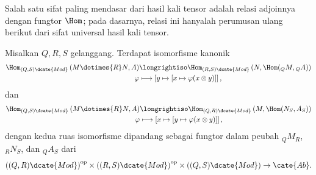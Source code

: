 Salah satu sifat paling mendasar dari hasil kali tensor adalah relasi adjoinnya dengan fungtor $\Hom$; pada dasarnya, relasi ini hanyalah perumusan ulang berikut dari sifat universal hasil kali tensor.
\begin{theorem}\label{prop:Hom-tensor-adjunction}
	Misalkan $Q, R, S$ gelanggang. Terdapat isomorfisme kanonik
	\begin{align*}
		\Hom_{(Q,S)\dcate{Mod}} \left( M \dotimes{R} N, A \right) & \longrightiso \Hom_{(R,S)\dcate{Mod}} \left( N, \Hom({}_Q M, {}_Q A) \right) \\
		\varphi & \longmapsto \left[ y \mapsto [x \mapsto \varphi(x \otimes y)] \right],
	\end{align*}
	dan
	\begin{align*}
		\Hom_{(Q,S)\dcate{Mod}} \left( M \dotimes{R} N, A \right) & \longrightiso \Hom_{(Q,R)\dcate{Mod}} \left( M, \Hom(N_S, A_S) \right) \\
		\varphi & \longmapsto \left[ x \mapsto [y \mapsto \varphi(x \otimes y)] \right],
	\end{align*}
	dengan kedua ruas isomorfisme dipandang sebagai fungtor dalam peubah ${}_Q M_R$, ${}_R N_S$, dan ${}_Q A_S$ dari
  \[ \left( (Q, R)\dcate{Mod}\right)^\text{op} \times \left((R, S)\dcate{Mod}\right)^\text{op} \times \left((Q, S)\dcate{Mod}\right) \to \cate{Ab}. \]
\end{theorem}
